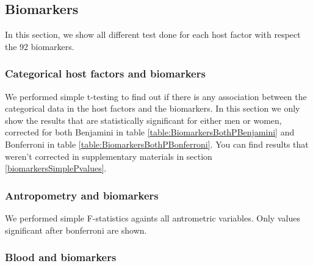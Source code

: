 \documentclass[10pt, a4paper, onecolumn]{article} %
\begin{document}
	


\subsection{Biomarkers}

In this section, we show all different test done for each host factor with respect the 92 biomarkers.\\

\subsubsection{Categorical host factors and biomarkers}

We performed simple t-testing to find out if there is any association between the categorical data in the host factors and the biomarkers. In this section we only show the results that are statistically significant for either men or women, corrected for both Benjamini in table \ref{table:BiomarkersBothPBenjamini} and Bonferroni in table \ref{table:BiomarkersBothPBonferroni}. You can find results that weren't corrected in supplementary materials in section \ref{biomarkersSimplePvalues}. \\

	

	

\subsubsection{Antropometry and biomarkers}

We performed simple F-statistics againts all antrometric variables. Only values significant after bonferroni are shown.\\

	

	

\subsubsection{Blood and biomarkers}
\end{document}
